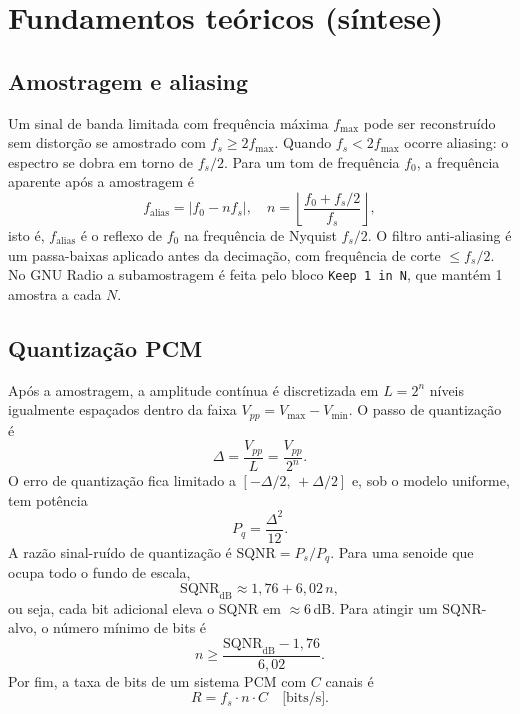 \documentclass[11pt,a4paper]{article}
\begin{document}
\section{Fundamentos teóricos (síntese)}

\subsection*{Amostragem e aliasing}

Um sinal de banda limitada com frequência máxima $f_\text{max}$ pode ser
reconstruído sem distorção se amostrado com $f_s \geq 2 f_\text{max}$. Quando
$f_s < 2 f_\text{max}$ ocorre aliasing: o espectro se dobra em torno de
$f_s/2$. Para um tom de frequência $f_0$, a frequência aparente após a
amostragem é
\begin{equation}
  f_\text{alias} = \left|f_0 - n f_s\right|, \quad
  n = \left\lfloor\frac{f_0 + f_s/2}{f_s}\right\rfloor,
  \label{eq:alias}
\end{equation}
isto é, $f_\text{alias}$ é o reflexo de $f_0$ na frequência de Nyquist
$f_s/2$. O filtro anti-aliasing é um passa-baixas aplicado antes da
decimação, com frequência de corte $\leq f_s/2$. No GNU Radio a
subamostragem é feita pelo bloco \texttt{Keep 1 in N}, que mantém 1
amostra a cada $N$.

\subsection*{Quantização PCM}

Após a amostragem, a amplitude contínua é discretizada em $L = 2^n$ níveis
igualmente espaçados dentro da faixa $V_{pp} = V_\text{max}-V_\text{min}$. O
passo de quantização é
\begin{equation}
  \Delta = \frac{V_{pp}}{L} = \frac{V_{pp}}{2^n}.
  \label{eq:delta}
\end{equation}
O erro de quantização fica limitado a $[-\Delta/2,\,+\Delta/2]$ e, sob o
modelo uniforme, tem potência
\begin{equation}
  P_q = \frac{\Delta^2}{12}.
  \label{eq:pq}
\end{equation}
A razão sinal-ruído de quantização é $\text{SQNR}=P_s/P_q$. Para uma
senoide que ocupa todo o fundo de escala,
\begin{equation}
  \text{SQNR}_\text{dB} \approx 1{,}76 + 6{,}02\,n,
  \label{eq:sqnr}
\end{equation}
ou seja, cada bit adicional eleva o SQNR em $\approx 6$\,dB. Para atingir
um SQNR-alvo, o número mínimo de bits é
\begin{equation}
  n \geq \frac{\text{SQNR}_\text{dB} - 1{,}76}{6{,}02}.
  \label{eq:nbits}
\end{equation}
Por fim, a taxa de bits de um sistema PCM com $C$ canais é
\begin{equation}
  R = f_s \cdot n \cdot C \quad\text{[bits/s]}.
  \label{eq:taxa}
\end{equation}
\end{document}
